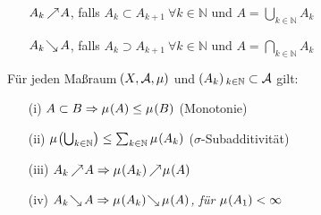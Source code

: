 \documentclass[skript.tex]{subfiles}
\begin{document}
	\begin{notat}
		\hfill
		\begin{itemize}
			\item[] $A_k \kern -1pt \nearrow \kern -2pt  A$, falls $A_k \subset A_{k+1}\ \forall k\in \mathbb{N}$ und $A = \bigcup_{k\in\mathbb{N}} A_k$
			\item[] $A_k \kern -2pt \searrow \kern -1pt  A$, falls $A_k \supset A_{k+1}\ \forall k\in \mathbb{N}$ und $A = \bigcap_{k\in\mathbb{N}} A_k$
		\end{itemize}
	\end{notat}

	\begin{theorem}
		Für jeden Maßraum $\pr{X,\mc{A},\mu}$ und $\pr{A_k}_{k\in\mathbb{N}} \subset \mc{A}$ gilt:
		\begin{itemize}
			\item[(i)] $A \subset B \Rightarrow \mu\pr{A} \leq \mu\pr{B}$ \textup{(Monotonie)}
			\item[(ii)] $\mu\pr{\bigcup_{k\in\mathbb{N}}} \leq \sum_{k\in\mathbb{N}} \mu\pr{A_k}$ \textup{($\sigma$-Subadditivität)}
			\item[(iii)] $A_k\nearr A\Rightarrow \mu\pr{A_k}\nearr \mu\pr{A}$
			\item[(iv)] $A_k\searr A\Rightarrow \mu\pr{A_k}\searr \mu\pr{A}$\textit{, für }$\mu\pr{A_1} < \infty$
		\end{itemize}
	\end{theorem}
\end{document}
